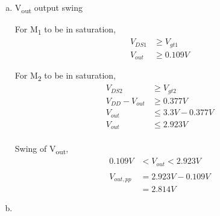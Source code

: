 \documentclass{article}
\begin{document}
\begin{enumerate}[(a)]
\item V\textsubscript{out} output swing

For M\textsubscript{1} to be in saturation,
\begin{equation*}
\begin{aligned}
V_{DS1} &\geq V_{gt1}\\
V_{out} &\geq 0.109 V
\end{aligned}
\end{equation*}

For M\textsubscript{2} to be in saturation,
\begin{equation*}
\begin{aligned}
V_{DS2} &\geq V_{gt2} \\
V_{DD} - V_{out} &\geq 0.377 V \\
V_{out} &\leq 3.3 V - 0.377 V \\
V_{out} &\leq 2.923 V \\
\end{aligned}
\end{equation*}

Swing of V\textsubscript{out},
\begin{equation*}
\begin{aligned}
0.109 V &< V_{out} < 2.923 V \\
\\
V_{out, pp} &= 2.923 V - 0.109 V \\
&= 2.814 V
\end{aligned}
\end{equation*}

\item 
\end{enumerate}
\end{document}
